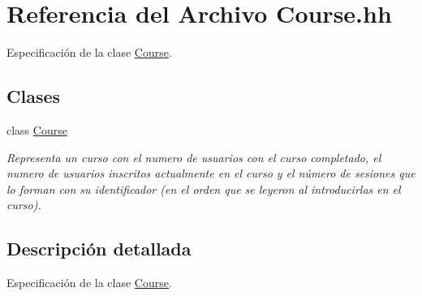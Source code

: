\hypertarget{_course_8hh}{}\section{Referencia del Archivo Course.\+hh}
\label{_course_8hh}


Especificación de la clase \mbox{\hyperlink{class_course}{Course}}.  


\subsection*{Clases}
\begin{DoxyCompactItemize}
\item 
class \mbox{\hyperlink{class_course}{Course}}
\begin{DoxyCompactList}\small\item\em Representa un curso con el numero de usuarios con el curso completado, el numero de usuarios inscritos actualmente en el curso y el número de sesiones que lo forman con su identificador (en el orden que se leyeron al introducirlas en el curso). \end{DoxyCompactList}\end{DoxyCompactItemize}


\subsection{Descripción detallada}
Especificación de la clase \mbox{\hyperlink{class_course}{Course}}. 

